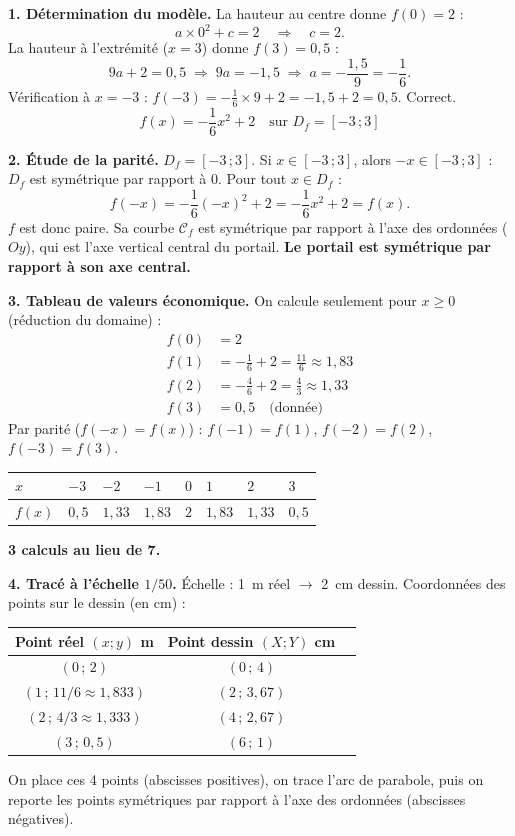 \documentclass[11pt]{article}
\newcommand{\cle}[1]{{\popxbold\color{popdark}#1}}
\begin{document}
\begin{exoresolu}
\textbf{1. Détermination du modèle.}
\tcblower
La hauteur au centre donne $f(0)=2$ :
\[ a\times 0^{2}+c=2 \quad\Longrightarrow\quad \boxed{c=2}. \]
La hauteur à l'extrémité ($x=3$) donne $f(3)=0,5$ :
\[ 9a+2=0,5 \;\Longrightarrow\; 9a=-1,5 \;\Longrightarrow\; a=-\frac{1,5}{9}=-\frac{1}{6}. \]
Vérification à $x=-3$ : $f(-3)=-\frac{1}{6}\times 9+2=-1,5+2=0,5$. Correct.
\[ \boxed{f(x)=-\frac{1}{6}x^{2}+2 \quad \text{sur } D_f=[-3\,;3]} \]

\textbf{2. Étude de la parité.}
$D_f=[-3\,;3]$. Si $x\in[-3\,;3]$, alors $-x\in[-3\,;3]$ : $D_f$ est symétrique par rapport à $0$.
Pour tout $x\in D_f$ :
\[ f(-x)=-\frac{1}{6}(-x)^{2}+2=-\frac{1}{6}x^{2}+2=f(x). \]
$f$ est donc \cle{paire}. Sa courbe $\mathcal{C}_f$ est symétrique par rapport à l'axe des ordonnées ($Oy$), qui est l'axe vertical central du portail. \textbf{Le portail est symétrique par rapport à son axe central.}

\textbf{3. Tableau de valeurs économique.}
On calcule seulement pour $x\ge 0$ (réduction du domaine) :
\begin{align*}
f(0) &= 2 \\
f(1) &= -\frac{1}{6}+2 = \frac{11}{6} \approx 1,83 \\
f(2) &= -\frac{4}{6}+2 = \frac{4}{3} \approx 1,33 \\
f(3) &= 0,5 \quad \text{(donnée)}
\end{align*}
Par parité ($f(-x)=f(x)$) : $f(-1)=f(1)$, $f(-2)=f(2)$, $f(-3)=f(3)$.
\begin{center}
\begin{tabularx}{\linewidth}{|l|X|X|X|X|X|X|X|}\hline
\rowcolor{popblueL} $x$ & $-3$ & $-2$ & $-1$ & $0$ & $1$ & $2$ & $3$ \\ \hline
$f(x)$ & $0,5$ & $1,33$ & $1,83$ & $2$ & $1,83$ & $1,33$ & $0,5$ \\ \hline
\end{tabularx}
\end{center}
\textbf{3 calculs au lieu de 7.}

\textbf{4. Tracé à l'échelle $1/50$.}
Échelle : \SI{1}{m} réel $\rightarrow$ \SI{2}{cm} dessin.
Coordonnées des points sur le dessin (en cm) :
\begin{center}
\begin{tabular}{|c|c|c|}\hline
Point réel $(x;y)$ m & Point dessin $(X;Y)$ cm \\ \hline
$(0\,;\,2)$ & $(0\,;\,4)$ \\ \hline
$(1\,;\,11/6\approx1,833)$ & $(2\,;\,3,67)$ \\ \hline
$(2\,;\,4/3\approx1,333)$ & $(4\,;\,2,67)$ \\ \hline
$(3\,;\,0,5)$ & $(6\,;\,1)$ \\ \hline
\end{tabular}
\end{center}
On place ces 4 points (abscisses positives), on trace l'arc de parabole, puis on reporte les points symétriques par rapport à l'axe des ordonnées (abscisses négatives).


\end{exoresolu}
\end{document}
